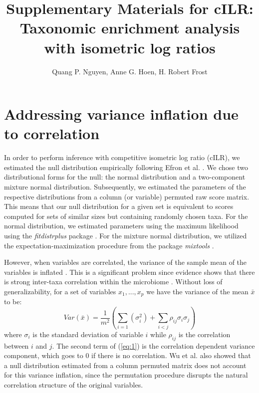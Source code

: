 \documentclass{article}
\title{Supplementary Materials for cILR: Taxonomic enrichment analysis with isometric log ratios}
\begin{document}
\author{Quang P. Nguyen, Anne G. Hoen, H. Robert Frost}
\maketitle
{}


\section{Addressing variance inflation due to correlation}
In order to perform inference with competitive isometric log ratio (cILR), we estimated the null distribution empirically following Efron et al. \cite{efron2004}. We chose two distributional forms for the null: the normal distribution and a two-component mixture normal distribution. Subsequently, we estimated the parameters of the respective distributions from a column (or variable) permuted raw score matrix. This means that our null distribution for a given set is equivalent to scores computed for sets of similar sizes but containing randomly chosen taxa. For the normal distribution, we estimated parameters using the maximum likelihood using the \emph{fitdistrplus} package \cite{delignette-muller2015}. For the mixture normal distribution, we utilized the expectation-maximization procedure from the package \emph{mixtools} \cite{benaglia2009}. 

However, when variables are correlated, the variance of the sample mean of the variables is inflated \cite{wu2012}. This is a significant problem since evidence shows that there is strong inter-taxa correlation within the microbiome \cite{kurtz2015}. Without loss of generalizability, for a set of variables $x_1, ..., x_p$ we have the variance of the mean $\bar{x}$ to be:  
\begin{equation} \label{eq:1}
    Var(\bar{x}) = \frac{1}{m^2}\left(\sum_{i = 1}(\sigma_i^2) + \sum_{i < j}\rho_{ij}\sigma_i\sigma_j\right)
\end{equation}
where $\sigma_i$ is the standard deviation of variable $i$ while $\rho_{ij}$ is the correlation between $i$ and $j$. The second term of (\ref{eq:1}) is the correlation dependent variance component, which goes to 0 if there is no correlation. Wu et al. \cite{wu2012} also showed that a null distribution estimated from a column permuted matrix does not account for this variance inflation, since the permutation procedure disrupts the natural correlation structure of the original variables. 
\end{document}
